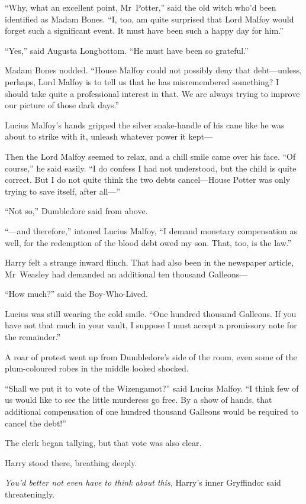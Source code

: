 “Why, what an excellent point, Mr~Potter,” said the old witch who’d been identified as Madam Bones. “I, too, am quite surprised that Lord Malfoy would forget such a significant event. It must have been such a happy day for him.”

“Yes,” said Augusta Longbottom. “He must have been so grateful.”

Madam Bones nodded. “House Malfoy could not possibly deny that debt—unless, perhaps, Lord Malfoy is to tell us that he has misremembered something? I should take quite a professional interest in that. We are always trying to improve our picture of those dark days.”

Lucius Malfoy’s hands gripped the silver snake-handle of his cane like he was about to strike with it, unleash whatever power it kept—

Then the Lord Malfoy seemed to relax, and a chill smile came over his face. “Of course,” he said easily. “I do confess I had not understood, but the child is quite correct. But I do not quite think the two debts cancel—House Potter was only trying to save itself, after all—”

“Not so,” Dumbledore said from above.

“—and therefore,” intoned Lucius Malfoy, “I demand monetary compensation as well, for the redemption of the blood debt owed my son. That, too, is the law.”

Harry felt a strange inward flinch. That had also been in the newspaper article, Mr~Weasley had demanded an additional ten thousand Galleons—

“How much?” said the Boy-Who-Lived.

Lucius was still wearing the cold smile. “One hundred thousand Galleons. If you have not that much in your vault, I suppose I must accept a promissory note for the remainder.”

A roar of protest went up from Dumbledore’s side of the room, even some of the plum-coloured robes in the middle looked shocked.

“Shall we put it to vote of the Wizengamot?” said Lucius Malfoy. “I think few of us would like to see the little murderess go free. By a show of hands, that additional compensation of one hundred thousand Galleons would be required to cancel the debt!”

The clerk began tallying, but that vote was also clear.

Harry stood there, breathing deeply.

\emph{You’d better not even have to think about this,} Harry’s inner Gryffindor said threateningly.

